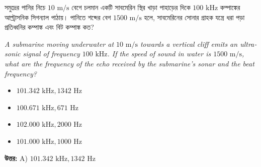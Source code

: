 \documentclass[12pt, a4paper]{article}
\begin{document}
\vspace{2em}

\begin{tcolorbox}[questionbox={প্রশ্ন (Question) 10}]
    \noindent
    সমুদ্রের পানির নিচে $10\text{ m/s}$ বেগে চলমান একটি সাবমেরিন স্থির খাড়া পাহাড়ের দিকে $100\text{ kHz}$ কম্পাঙ্কের আল্ট্রাসনিক সিগন্যাল পাঠায়। পানিতে শব্দের বেগ $1500\text{ m/s}$ হলে, সাবমেরিনের সোনার গ্রাহক যন্ত্রে ধরা পড়া প্রতিধ্বনির কম্পাঙ্ক এবং বিট কম্পাঙ্ক কত?
    
    \vspace{0.8em}
    \begin{english}
    \noindent\textit{\color{darkgray}
    A submarine moving underwater at $10\text{ m/s}$ towards a vertical cliff emits an ultrasonic signal of frequency $100\text{ kHz}$. If the speed of sound in water is $1500\text{ m/s}$, what are the frequency of the echo received by the submarine's sonar and the beat frequency?
    }
    \end{english}
\end{tcolorbox}

\begin{itemize}[label={}, leftmargin=1cm, itemsep=0.5em]
    \item[\textbf{A)}] $101.342\text{ kHz}, 1342\text{ Hz}$
    \item[\textbf{B)}] $100.671\text{ kHz}, 671\text{ Hz}$
    \item[\textbf{C)}] $102.000\text{ kHz}, 2000\text{ Hz}$
    \item[\textbf{D)}] $101.000\text{ kHz}, 1000\text{ Hz}$
\end{itemize}

\vspace{0.5em}
\begin{tcolorbox}[answerbox]
    \textbf{\color{success} উত্তর:} A) $101.342\text{ kHz}, 1342\text{ Hz}$
\end{tcolorbox}
\vspace{1em}
\end{document}
